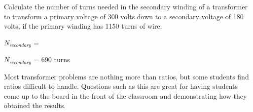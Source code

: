 

Calculate the number of turns needed in the secondary winding of a transformer to transform a primary voltage of 300 volts down to a secondary voltage of 180 volts, if the primary winding has 1150 turns of wire.

\vskip 10pt

$N_{secondary}$ =







$N_{secondary}$ = 690 turns







Most transformer problems are nothing more than ratios, but some students find ratios difficult to handle.  Questions such as this are great for having students come up to the board in the front of the classroom and demonstrating how they obtained the results.




